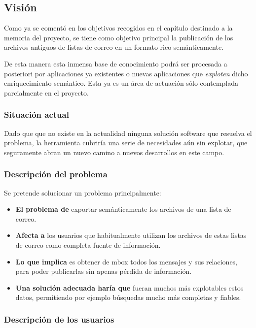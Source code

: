 
\subsection{Visión}

Como ya se comentó en los objetivos recogidos en el capítulo destinado a
la memoria del proyecto, se tiene como objetivo principal la publicación 
de los archivos antiguos de listas de correo en un formato rico 
semánticamente.

De esta manera esta inmensa base de conocimiento podrá ser procesada a 
posteriori por aplicaciones ya existentes o nuevas aplicaciones que 
\emph{exploten} dicho enriquecimiento semántico. Esta ya es un área de 
actuación sólo contemplada parcialmente en el proyecto.

\subsubsection{Situación actual}

Dado que que no existe en la actualidad ninguna solución software que
resuelva el problema, la herramienta cubriría una serie de necesidades
aún sin explotar, que seguramente abran un nuevo camino a nuevos 
desarrollos en este campo.

\subsubsection{Descripción del problema}

Se pretende solucionar un problema principalmente:

\begin{itemize}
  \item \textbf{El problema de} exportar semánticamente los archivos 
	de una lista de correo.
  \item \textbf{Afecta a} los usuarios que habitualmente utilizan los 
	archivos de estas listas de correo como completa fuente de 
	información.
  \item \textbf{Lo que implica} es obtener de mbox todos los mensajes 
	y sus relaciones, para poder publicarlas sin apenas pérdida de
	información.
  \item \textbf{Una solución adecuada haría que} fueran muchos más
	explotables estos datos, permitiendo por ejemplo búsquedas
	mucho más completas y fiables.
\end{itemize}

\subsubsection{Descripción de los usuarios}

